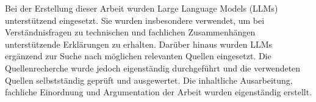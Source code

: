 
Bei der Erstellung dieser Arbeit wurden Large Language Models (LLMs) unterstützend eingesetzt.
Sie wurden insbesondere verwendet, um bei Verständnisfragen zu technischen und fachlichen Zusammenhängen
unterstützende Erklärungen zu erhalten.
Darüber hinaus wurden LLMs ergänzend zur Suche nach möglichen relevanten Quellen eingesetzt.
Die Quellenrecherche wurde jedoch eigenständig durchgeführt und die verwendeten Quellen selbstständig geprüft
und ausgewertet.
Die inhaltliche Ausarbeitung, fachliche Einordnung und Argumentation der Arbeit wurden eigenständig erstellt.